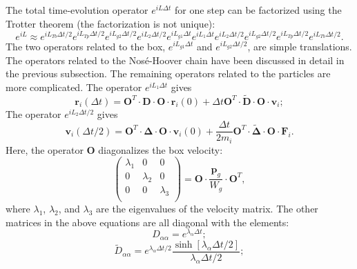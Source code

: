 \documentclass[12pt,a4paper]{report}
\newcommand{\vect}[1]{\boldsymbol{#1}}
\begin{document}
The total time-evolution operator $e^{iL\Delta t} $ for one step can be factorized using the Trotter theorem (the factorization is not unique):
\begin{equation}
e^{iL} \approx
e^{iL_{Tb}\Delta t/2}
e^{iL_{Tp}\Delta t/2}
e^{iL_{g2}\Delta t/2}
e^{iL_2\Delta t/2}
e^{iL_{g1}\Delta t}
e^{iL_1\Delta t}
e^{iL_2\Delta t/2}
e^{iL_{g2}\Delta t/2}
e^{iL_{Tp}\Delta t/2}
e^{iL_{Tb}\Delta t/2}.
\end{equation}
The two operators related to the box, $e^{iL_{g1}\Delta t}$ and $e^{iL_{g2}\Delta t/2}$, are simple translations. The operators related to the Nos\'{e}-Hoover chain have been discussed in detail in the previous subsection. The remaining operators related to the particles are more complicated. The operator $e^{iL_{1}\Delta t}$ gives 
\begin{equation}
\vect{r}_i(\Delta t)= \mathbf{O}^T \cdot \mathbf{D} \cdot \mathbf{O} \cdot
\vect{r}_i(0) + \Delta t \mathbf{O}^T \cdot \tilde{\mathbf{D}} \cdot \mathbf{O} \cdot
\vect{v}_i;
\end{equation}
The operator $e^{iL_{2}\Delta t/2}$ gives 
\begin{equation}
\vect{v}_i(\Delta t/2)= \mathbf{O}^T \cdot \mathbf{\Delta} \cdot \mathbf{O} \cdot
\vect{v}_i(0) + \frac{\Delta t}{2m_i} \mathbf{O}^T \cdot \tilde{\mathbf{\Delta}} \cdot \mathbf{O} \cdot
\vect{F}_i.
\end{equation}
Here, the operator $\mathbf{O}$ diagonalizes the box velocity:
\begin{equation}
\left(
\begin{array}{ccc}
\lambda_1 & 0 & 0\\
0 & \lambda_2 & 0\\
0 & 0 & \lambda_3\\
\end{array}
\right) = \mathbf{O} \cdot \frac{\mathbf{p}_g}{W_g} \cdot \mathbf{O}^T,
\end{equation}
where $\lambda_1$, $\lambda_2$, and $\lambda_3$ are the eigenvalues of the velocity matrix. The other matrices in the above equations are all diagonal with the elements:
\begin{equation}
D_{\alpha\alpha} = e^{\lambda_{\alpha} \Delta t};
\end{equation}
\begin{equation}
\tilde{D}_{\alpha\alpha} = e^{\lambda_{\alpha} \Delta t/2} \frac{\sinh\left[\lambda_{\alpha} \Delta t/2\right]}{\lambda_{\alpha} \Delta t/2};
\end{equation}
\end{document}
